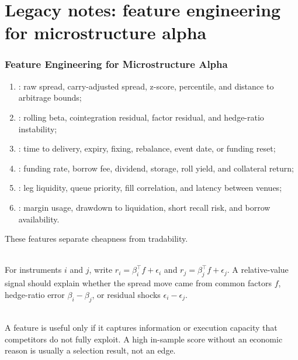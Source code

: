 \documentclass[a4paper,oneside,openany]{book}
\begin{document}
\chapter*{Legacy notes: feature engineering for microstructure alpha}

\subsection*{Feature Engineering for Microstructure Alpha}

\begin{taxonomy} 
\begin{enumerate}[label=\roman*.]
\setlength{\itemsep}{0pt}
\item {}: raw spread, carry-adjusted spread, z-score, percentile, and distance to arbitrage bounds;
\item {}: rolling beta, cointegration residual, factor residual, and hedge-ratio instability;
\item {}: time to delivery, expiry, fixing, rebalance, event date, or funding reset;
\item {}: funding rate, borrow fee, dividend, storage, roll yield, and collateral return;
\item {}: leg liquidity, queue priority, fill correlation, and latency between venues;
\item {}: margin usage, drawdown to liquidation, short recall risk, and borrow availability.
\end{enumerate}
These features separate cheapness from tradability.
\end{taxonomy}

\begin{model} \\
For instruments $i$ and $j$, write $r_i=\beta_i^\top f+\epsilon_i$ and $r_j=\beta_j^\top f+\epsilon_j$. A relative-value signal should explain whether the spread move came from common factors $f$, hedge-ratio error $\beta_i-\beta_j$, or residual shocks $\epsilon_i-\epsilon_j$.
\end{model}

\begin{principle} \\
A feature is useful only if it captures information or execution capacity that competitors do not fully exploit. A high in-sample score without an economic reason is usually a selection result, not an edge.
\end{principle}
\end{document}
